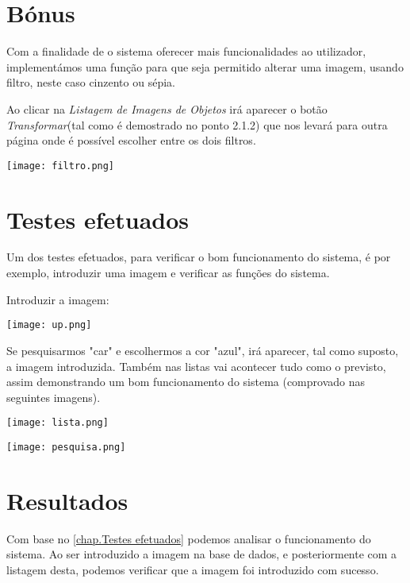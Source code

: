 \documentclass{report}
\begin{document}
\chapter{Bónus}
\label{chap.Bónus}
Com a finalidade de o sistema oferecer mais funcionalidades ao utilizador, implementámos uma função para que seja permitido alterar uma imagem, usando filtro, neste caso cinzento ou sépia.

Ao clicar na \textit{Listagem de Imagens de Objetos} irá aparecer o botão \textit{Transformar}(tal como é demostrado no ponto 2.1.2) que nos levará para outra página onde é possível escolher entre os dois filtros.

\begin{center}
   \texttt{[image: filtro.png]}
\end{center}
  
\chapter{Testes efetuados}
\label{chap.Testes efetuados}
Um dos testes efetuados, para verificar o bom funcionamento do sistema, é por exemplo, introduzir uma imagem e verificar as funções do sistema.


Introduzir a imagem:
\begin{center}
   \texttt{[image: up.png]}
\end{center}

Se pesquisarmos "car" e escolhermos a cor "azul", irá aparecer, tal como suposto, a imagem introduzida. Também nas listas vai acontecer tudo como o previsto, assim demonstrando um bom funcionamento do sistema (comprovado nas seguintes imagens).
\begin{center}  
  \texttt{[image: lista.png]}
\end{center}

\begin{center}  
  \texttt{[image: pesquisa.png]}
\end{center}


\chapter{Resultados}
\label{chap.Resultados}
Com base no \autoref{chap.Testes efetuados} podemos analisar o funcionamento do sistema. Ao ser introduzido a imagem na base de dados, e posteriormente com a listagem desta, podemos verificar que a imagem foi introduzido com sucesso. 
\end{document}
